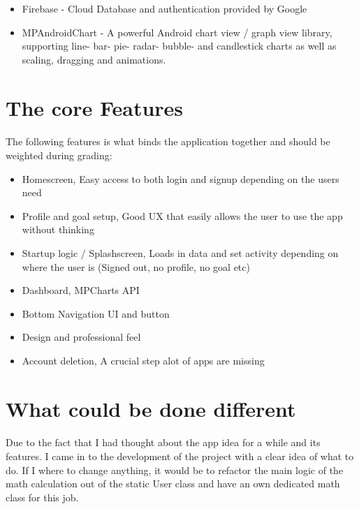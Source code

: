 \documentclass{article}
\begin{document}
        \hfill \break

        \begin{itemize}
            \item Firebase       - Cloud Database and authentication provided by Google
            \item MPAndroidChart - A powerful Android chart view / graph view library, supporting line- bar- pie- radar- bubble- and candlestick charts as well as scaling, dragging and animations.
        \end{itemize}

\newpage

\section{The core Features}
\paragraph{}
    The following features is what binds the application together and should be weighted during grading:

    \hfill \break

    \begin{itemize}
        \item Homescreen, Easy access to both login and signup depending on the users need
        \item Profile and goal setup, Good UX that easily allows the user to use the app without thinking
        \item Startup logic / Splashscreen, Loads in data and set activity depending on where the user is (Signed out, no profile, no goal etc)
        \item Dashboard, MPCharts API
        \item Bottom Navigation UI and button
        \item Design and professional feel 
        \item Account deletion, A crucial step alot of apps are missing
    \end{itemize}
\newpage    


\newpage

\section{What could be done different}
\paragraph{}
    Due to the fact that I  had thought about the app idea for a while and its features. I came in to the development of the project with a clear idea of what to do.
    If I where to change anything, it would be to refactor the main logic of the math calculation out of the static User class and have an own dedicated math class
    for this job. 
\end{document}
